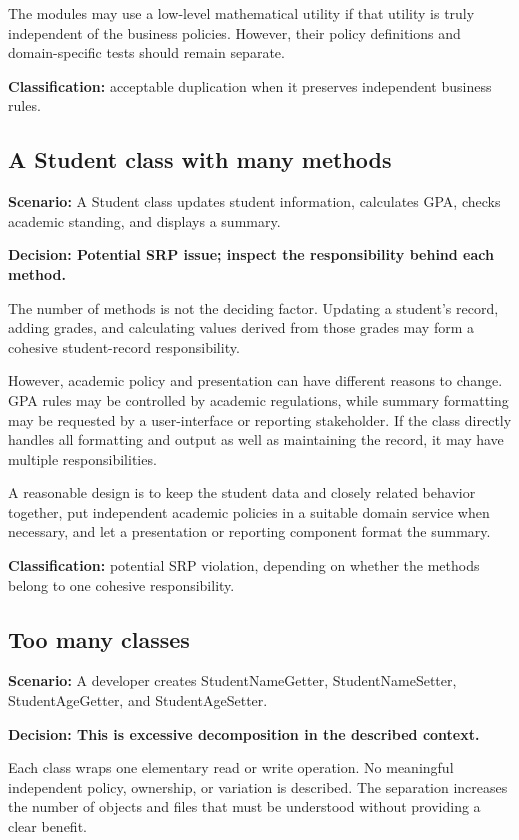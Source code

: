 \documentclass[12pt,a4paper]{article}
\begin{document}
The modules may use a low-level mathematical utility if that utility is truly independent of the business policies. However, their policy definitions and domain-specific tests should remain separate.

\textbf{Classification:} acceptable duplication when it preserves independent business rules.

\subsection{A Student class with many methods}

\textbf{Scenario:} A Student class updates student information, calculates GPA, checks academic standing, and displays a summary.

\textbf{Decision: Potential SRP issue; inspect the responsibility behind each method.}

The number of methods is not the deciding factor. Updating a student's record, adding grades, and calculating values derived from those grades may form a cohesive student-record responsibility.

However, academic policy and presentation can have different reasons to change. GPA rules may be controlled by academic regulations, while summary formatting may be requested by a user-interface or reporting stakeholder. If the class directly handles all formatting and output as well as maintaining the record, it may have multiple responsibilities.

A reasonable design is to keep the student data and closely related behavior together, put independent academic policies in a suitable domain service when necessary, and let a presentation or reporting component format the summary.

\textbf{Classification:} potential SRP violation, depending on whether the methods belong to one cohesive responsibility.

\subsection{Too many classes}

\textbf{Scenario:} A developer creates StudentNameGetter, StudentNameSetter, StudentAgeGetter, and StudentAgeSetter.

\textbf{Decision: This is excessive decomposition in the described context.}

Each class wraps one elementary read or write operation. No meaningful independent policy, ownership, or variation is described. The separation increases the number of objects and files that must be understood without providing a clear benefit.
\end{document}
